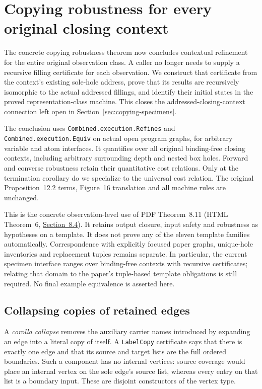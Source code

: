 \clearpage
\section{Copying robustness for every original closing context}
\label{sec:copying-contextual-robustness}
The concrete copying robustness theorem now concludes contextual refinement
for the entire original observation class. A caller no longer needs to supply
a recursive filling certificate for each observation. We construct that
certificate from the context's existing sole-hole address, prove that its
results are recursively isomorphic to the actual addressed fillings, and
identify their initial states in the proved representation-class machine.
This closes the addressed-closing-context connection left open in
Section~\ref{sec:copying-specimens}.

The conclusion uses \texttt{Combined.execution.Refines} and
\texttt{Combined.execution.Equiv} on actual open program graphs, for arbitrary
variable and atom interfaces. It quantifies over all original binding-free
closing contexts, including arbitrary surrounding depth and nested box holes.
Forward and converse robustness retain their quantitative cost relations.
Only at the termination corollary do we specialize to the universal cost
relation. The original Proposition~12.2 terms, Figure~16 translation and all
machine rules are unchanged.

This is the concrete observation-level use of PDF Theorem~8.11 (HTML
Theorem~6, \href{https://arxiv.org/html/1907.01257v5\#S8.SS4}{Section~8.4}).
It retains output closure, input safety and robustness as hypotheses on a
template. It does not prove any of the eleven template families automatically.
Correspondence with explicitly focused paper graphs, unique-hole inventories
and replacement tuples remains separate. In particular, the current specimen
interface ranges over binding-free contexts with recursive certificates;
relating that domain to the paper's tuple-based template obligations is still
required. No final example equivalence is asserted here.

\subsection{Collapsing copies of retained edges}
A \emph{corolla collapse} removes the auxiliary carrier names introduced by
expanding an edge into a literal copy of itself. A \texttt{LabelCopy}
certificate says that there is exactly one edge and that its source and
target lists are the full ordered boundaries. Such a component has no internal
vertices: source coverage would place an internal vertex on the sole edge's
source list, whereas every entry on that list is a boundary input. These are
disjoint constructors of the vertex type.

